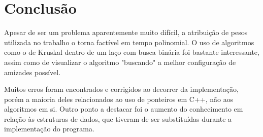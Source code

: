 \documentclass[a4paper,12pt,titlepage]{article}
\begin{document}
\section{Conclusão}

Apesar de ser um problema aparentemente muito difícil, a atribuição de pesos utilizada no trabalho o torna factível em tempo polinomial. O uso de algoritmos como o de Kruskal dentro de um laço com busca binária foi bastante interessante, assim como de visualizar o algoritmo "buscando" a melhor configuração de amizades possível.

Muitos erros foram encontrados e corrigidos ao decorrer da implementação, porém a maioria deles relacionados ao uso de ponteiros em C++, não aos algoritmos em si. Outro ponto a destacar foi o aumento do conhecimento em relação às estruturas de dados, que tiveram de ser substituídas durante a implementação do programa.


\newpage
\end{document}
